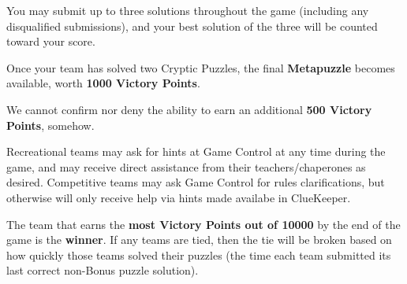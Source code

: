 You may submit up to three solutions throughout
the game (including any disqualified submissions), and your best solution of the
three will be counted toward your score.

\newpage


Once your team has solved two Cryptic Puzzles, the final \textbf{Metapuzzle}
becomes available, worth \textbf{1000 Victory Points}.


We cannot confirm nor deny the ability to earn an additional \textbf{500 Victory Points},
somehow.


Recreational teams may ask for hints at Game Control at any time during
the game, and may receive direct assistance from their teachers/chaperones
as desired.
Competitive teams may ask Game Control for rules clarifications, but otherwise
will only receive help via hints made availabe in ClueKeeper.


The team that earns the \textbf{most Victory Points out of 10000}
by the end of the game is the \textbf{winner}. If any teams are tied,
then the tie will be broken based on how quickly those teams solved their puzzles
(the time each team submitted its last correct non-Bonus puzzle solution).


